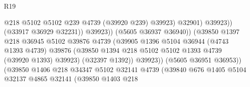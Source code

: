 \begin{lexlean}{R19}
\begin{coremodule}
{{{{{{{{{{{                                                    @218
                                                    @5102
                                                    @5102
                                                    @239
                                                    @4739
                                                    (@39920 @239)
                                                    @39923)
                                                  @32901)
                                                @39923))
                                            (@33917 @36929 @32231))
                                          @39923))
                                      (@5605 @36937 @36940))
                                    (@39850
                                      @1397
                                      @218
                                      @36945
                                      @5102
                                      @39876
                                      @4739
                                      (@39905
                                        @1396
                                        @5104
                                        @36944
                                        (@4743 @1393 @4739)
                                        @39876
                                        (@39850
                                          @1394
                                          @218
                                          @5102
                                          @5102
                                          @1393
                                          @4739
                                          (@39920 @1393)
                                          @39923)
                                        (@32397 @1392))
                                      @39923))
                                  (@5605 @36951 @36953))
                                (@39850
                                  @1406
                                  @218
                                  @34347
                                  @5102
                                  @32141
                                  @4739
                                  (@39840
                                    @676
                                    @1405
                                    @5104
                                    @32137
                                    @4865
                                    @32141
                                    (@39850
                                      @1403
                                      @218
}}}}}}}}}}}
\end{coremodule}
\end{lexlean}

